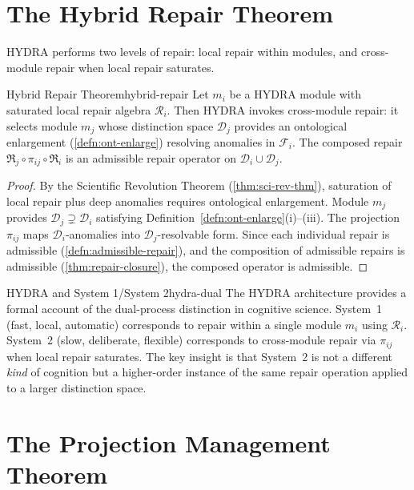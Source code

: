 \documentclass[12pt,twoside,openright]{book}
\newcommand{\csicon} {\marginpar{\tiny\color{DistBlue}\faCode}}
\newcommand{\repair}{\mathfrak{R}}
\begin{document}
\section{The Hybrid Repair Theorem}

HYDRA performs two levels of repair: local repair within
modules, and cross-module repair when local repair
saturates.

\begin{theorem}{Hybrid Repair Theorem}{hybrid-repair}
  Let $m_i$ be a HYDRA module with saturated local repair
  algebra $\mathcal{R}_i$.
  Then HYDRA invokes cross-module repair:
  it selects module $m_j$ whose distinction space
  $\mathcal{D}_j$ provides an ontological enlargement
  (\cref{defn:ont-enlarge}) resolving anomalies in
  $\mathcal{F}_i$.
  The composed repair
  $\repair_j \circ \pi_{ij} \circ \repair_i$
  is an admissible repair operator on
  $\mathcal{D}_i \cup \mathcal{D}_j$.
\end{theorem}

\begin{proof}
  By the Scientific Revolution Theorem
  (\cref{thm:sci-rev-thm}), saturation of local repair
  plus deep anomalies requires ontological enlargement.
  Module $m_j$ provides $\mathcal{D}_j \supsetneq
  \mathcal{D}_i$ satisfying
  Definition~\ref{defn:ont-enlarge}(i)--(iii).
  The projection $\pi_{ij}$ maps $\mathcal{D}_i$-anomalies
  into $\mathcal{D}_j$-resolvable form.
  Since each individual repair is admissible
  (\cref{defn:admissible-repair}), and the composition
  of admissible repairs is admissible
  (\cref{thm:repair-closure}), the composed operator is
  admissible.
\end{proof}

\begin{remark}{HYDRA and System 1/System 2}{hydra-dual}
  \csicon
  The HYDRA architecture provides a formal account of
  the dual-process distinction in cognitive science.
  System~1 (fast, local, automatic) corresponds to
  repair within a single module $m_i$ using $\mathcal{R}_i$.
  System~2 (slow, deliberate, flexible) corresponds to
  cross-module repair via $\pi_{ij}$ when local repair
  saturates. The key insight is that System~2 is not a
  different \emph{kind} of cognition but a higher-order
  instance of the same repair operation applied to a
  larger distinction space.
\end{remark}

\section{The Projection Management Theorem}
\end{document}
